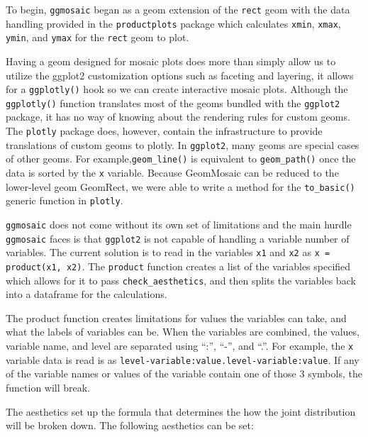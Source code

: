 To begin, \texttt{ggmosaic} began as a geom extension of the
\texttt{rect} geom with the data handling provided in the
\texttt{productplots} package which calculates \texttt{xmin},
\texttt{xmax}, \texttt{ymin}, and \texttt{ymax} for the \texttt{rect}
geom to plot.

Having a geom designed for mosaic plots does more than simply allow us
to utilize the ggplot2 customization options such as faceting and
layering, it allows for a \texttt{ggplotly()} hook so we can create
interactive mosaic plots. Although the \texttt{ggplotly()} function
translates most of the geoms bundled with the \texttt{ggplot2} package,
it has no way of knowing about the rendering rules for custom geoms. The
\texttt{plotly} package does, however, contain the infrastructure to
provide translations of custom geoms to plotly. In \texttt{ggplot2},
many geoms are special cases of other geoms. For
example,\texttt{geom\_line()} is equivalent to \texttt{geom\_path()}
once the data is sorted by the \texttt{x} variable. \citet{carson}
Because GeomMosaic can be reduced to the lower-level geom GeomRect, we
were able to write a method for the \texttt{to\_basic()} generic
function in \texttt{plotly}.

\texttt{ggmosaic} does not come without its own set of limitations and
the main hurdle \texttt{ggmosaic} faces is that \texttt{ggplot2} is not
capable of handling a variable number of variables. The current solution
is to read in the variables \texttt{x1} and \texttt{x2} as
\texttt{x = product(x1, x2)}. The \texttt{product} function creates a
list of the variables specified which allows for it to pass
\texttt{check\_aesthetics}, and then splits the variables back into a
dataframe for the calculations.

The product function creates limitations for values the variables can
take, and what the labels of variables can be. When the variables are
combined, the values, variable name, and level are separated using
``:'', ``-'', and ``.''. For example, the \texttt{x} variable data is
read is as \texttt{level-variable:value.level-variable:value}. If any of
the variable names or values of the variable contain one of those 3
symbols, the function will break.

The aesthetics set up the formula that determines the how the joint
distribution will be broken down. The following aesthetics can be set:

